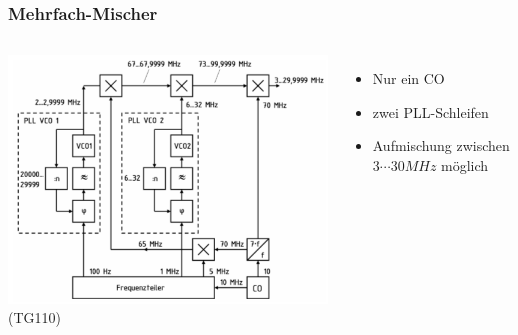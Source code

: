 \begin{frame}
  \frametitle{Mehrfach-Mischer}


  \begin{columns}[c]
    \includegraphics[width=\textwidth,height=.85\textheight,keepaspectratio]{a13/TG110.png}
    {\tiny (TG110)}
    \begin{itemize}
      \item Nur ein CO
      \item zwei PLL-Schleifen
      \item Aufmischung zwischen $3\cdots30MHz$ möglich
    \end{itemize}
  \end{columns}
\end{frame}

